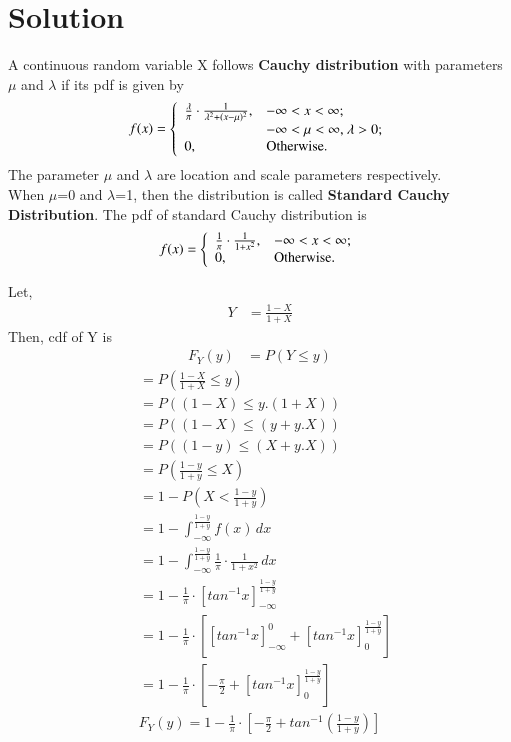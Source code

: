 \documentclass[journal,12pt,twocolumn]{IEEEtran}
\begin{document}
\section{Solution}
A continuous random variable X follows \textbf{Cauchy distribution} with parameters $\mu$ and $\lambda$ if its pdf is given by
\\
    \begin{equation*} f(x) =\left\{ \begin{array}{ll} \frac{\lambda}{\pi}\cdot \frac{1}{\lambda^2+(x-\mu)^2}, & \hbox{$-\infty < x< \infty$;} \\ & \hbox{$-\infty < \mu< \infty$, $\lambda>0$;} \\ 0, & \hbox{Otherwise.} \end{array} \right. \end{equation*}
The parameter $\mu$ and $\lambda$ are location and scale parameters respectively. 
\\
When $\mu$=0 and $\lambda$=1, then the distribution is called \textbf{Standard Cauchy Distribution}. The pdf of standard Cauchy distribution is
\\
\begin{equation*} f(x) =\left\{ \begin{array}{ll} \frac{1}{\pi}\cdot \frac{1}{1+x^2}, & \hbox{$-\infty < x< \infty$;} \\ 0, & \hbox{Otherwise.} \end{array} \right. \end{equation*}

Let,
\begin{align}
    Y &= \frac{1-X}{1+X}
\end{align}
Then, cdf of Y is
\begin{align}
    F_{Y}(y) &= P(Y \leq y)
\end{align}
\begin{align}
    &= P\left(\frac{1-X}{1+X} \leq y\right) \\
    &= P\left((1-X) \leq y.(1+X)\right) \\
    &= P\left((1-X) \leq (y+y.X)\right) \\
    &= P\left((1-y) \leq (X+y.X)\right) \\
    &= P\left(\frac{1-y}{1+y} \leq X \right) \\
    &= 1 - P\left(X < \frac{1-y}{1+y}\right) \\
    &= 1 -  \int_{-\infty}^{\frac{1-y}{1+y}} f(x) \,dx \\
    &= 1 -  \int_{-\infty}^{\frac{1-y}{1+y}} \frac{1}{\pi}\cdot \frac{1}{1+x^2} \,dx\\
    &= 1 -  \frac{1}{\pi}\cdot \left[tan^{-1}x\right]_{-\infty}^{\frac{1-y}{1+y}}\\
    &= 1 -  \frac{1}{\pi}\cdot \left[\left[tan^{-1}x\right]_{-\infty}^{0}+\left[tan^{-1}x\right]_{0}^{\frac{1-y}{1+y}}\right]\\
    &= 1 -  \frac{1}{\pi}\cdot \left[-\frac{\pi}{2}+\left[tan^{-1}x\right]_{0}^{\frac{1-y}{1+y}}\right] 
\end{align}
\begin{align}
    F_{Y}(y) = 1 -  \frac{1}{\pi}\cdot \left[-\frac{\pi}{2}+tan^{-1}\left({\frac{1-y}{1+y}}\right)\right]
\end{align} 
\end{document}

